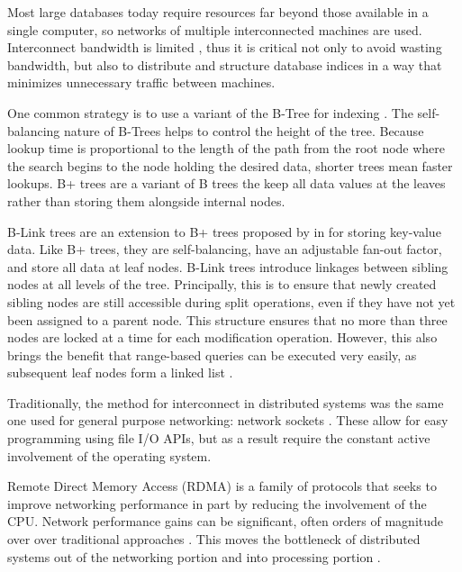 
\label{sec:indexing}

Most large databases today require resources far beyond those available in a
single computer, so networks of multiple interconnected machines are used.
Interconnect bandwidth is limited \autocite{binnig-vldb-2016}, thus it is
critical not only to avoid wasting bandwidth, but also to distribute and
structure database indices in a way that minimizes unnecessary traffic between
machines.

One common strategy is to use a variant of the B-Tree for indexing
\autocite{ma-tpds-2022}. The self-balancing nature of B-Trees helps to control
the height of the tree. Because lookup time is proportional to the length of the
path from the root node where the search begins to the node holding the desired
data, shorter trees mean faster lookups. B+ trees are a variant of B trees the
keep all data values at the leaves rather than storing them alongside internal
nodes.

B-Link trees are an extension to B+ trees proposed by \citeauthor{b-link} in
\citeyear{b-link} for storing key-value data. Like B+ trees, they are
self-balancing, have an adjustable fan-out factor, and store all data at leaf
nodes. B-Link trees introduce linkages between sibling nodes at all levels of
the tree. Principally, this is to ensure that newly created sibling nodes are
still accessible during split operations, even if they have not yet been
assigned to a parent node. This structure ensures that no more than three nodes
are locked at a time for each modification operation. However, this also brings
the benefit that range-based queries can be executed very easily, as subsequent
leaf nodes form a linked list \autocite{b-link}.


\label{sec:rdma}

Traditionally, the method for interconnect in distributed systems was the same
one used for general purpose networking: network sockets
\autocite{binnig-vldb-2016}. These allow for easy programming using file I/O
APIs, but as a result require the constant active involvement of the operating
system.

Remote Direct Memory Access (RDMA) is a family of protocols that seeks to
improve networking performance in part by reducing the involvement of the CPU.
Network performance gains can be significant, often orders of magnitude over
over traditional approaches \autocite{ma-tpds-2022,rdma-reads}. This moves the
bottleneck of distributed systems out of the networking portion and into
processing portion \autocite{binnig-vldb-2016}.

